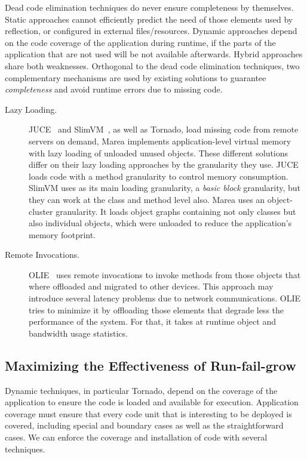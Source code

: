 Dead code elimination techniques do never ensure completeness by themselves. Static approaches cannot efficiently predict the need of those elements used by reflection, or configured in external files/resources. Dynamic approaches depend on the code coverage of the application during runtime, \ie if the parts of the application that are not used will be not available afterwards. Hybrid approaches share both weaknesses. Orthogonal to the dead code elimination techniques, two complementary mechanisms are used by existing solutions to guarantee \emph{completeness} and avoid runtime errors due to missing code.

\begin{description}
\item[Lazy Loading.] JUCE~\cite{Popa04a,Teod01a} and SlimVM~\cite{Kers09a, Wagn11a}, as well as Tornado, load missing code from remote servers on demand, Marea\cite{Mart12a} implements application-level virtual memory with lazy loading of unloaded unused objects. These different solutions differ on their lazy loading approaches by the granularity they use. JUCE loads code with a method granularity to control memory consumption. SlimVM uses as its main loading granularity, a \emph{basic block} granularity, but they can work at the class and method level also. Marea uses an object-cluster granularity. It loads object graphs containing not only classes but also individual objects, which were unloaded to reduce the application's memory footprint.
\item[Remote Invocations.] OLIE~\cite{Gu03a} uses remote invocations to invoke methods from those objects that where offloaded and migrated to other devices. This approach may introduce several latency problems due to network communications. OLIE tries to minimize it by offloading those elements that degrade less the performance of the system. For that, it takes at runtime object and bandwidth usage statistics.
\end{description}

\subsection{Maximizing the Effectiveness of Run-fail-grow}\label{sec:maximize_effectiveness}

Dynamic techniques, in particular Tornado, depend on the coverage of the application to ensure the code is loaded and available for execution. Application coverage must ensure that every code unit that is interesting to be deployed is covered, including special and boundary cases as well as the straightforward cases. We can enforce the coverage and installation of code with several techniques. 


